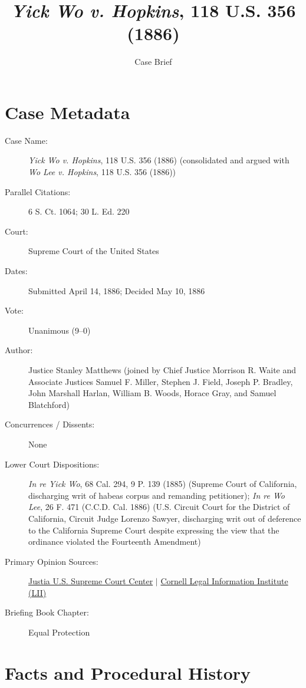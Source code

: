 \documentclass[12pt]{article}
\title{\textit{Yick Wo v. Hopkins}, 118 U.S. 356 (1886)}
\author{Case Brief}
\date{}
\begin{document}
\maketitle

\section{Case Metadata}

\begin{description}
    \item[Case Name:] \emph{Yick Wo v. Hopkins}, 118 U.S. 356 (1886) (consolidated and argued with \emph{Wo Lee v. Hopkins}, 118 U.S. 356 (1886))
    \item[Parallel Citations:] 6 S. Ct. 1064; 30 L. Ed. 220
    \item[Court:] Supreme Court of the United States
    \item[Dates:] Submitted April 14, 1886; Decided May 10, 1886
    \item[Vote:] Unanimous (9--0)
    \item[Author:] Justice Stanley Matthews (joined by Chief Justice Morrison R. Waite and Associate Justices Samuel F. Miller, Stephen J. Field, Joseph P. Bradley, John Marshall Harlan, William B. Woods, Horace Gray, and Samuel Blatchford)
    \item[Concurrences / Dissents:] None
    \item[Lower Court Dispositions:] \emph{In re Yick Wo}, 68 Cal. 294, 9 P. 139 (1885) (Supreme Court of California, discharging writ of habeas corpus and remanding petitioner); \emph{In re Wo Lee}, 26 F. 471 (C.C.D. Cal. 1886) (U.S. Circuit Court for the District of California, Circuit Judge Lorenzo Sawyer, discharging writ out of deference to the California Supreme Court despite expressing the view that the ordinance violated the Fourteenth Amendment)
    \item[Primary Opinion Sources:] \href{https://supreme.justia.com/cases/federal/us/118/356/}{Justia U.S. Supreme Court Center} $|$ \href{https://www.law.cornell.edu/supremecourt/text/118/356}{Cornell Legal Information Institute (LII)}
    \item[Briefing Book Chapter:] Equal Protection
\end{description}

\section{Facts and Procedural History}
\end{document}
